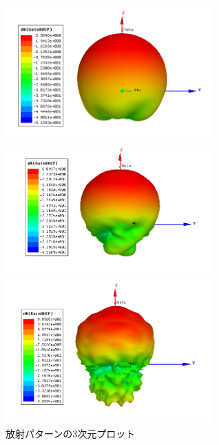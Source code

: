 \documentclass[11pt,a4paper,uplatex,draft]{ujarticle}
\begin{document}
  \begin{figure}[htbp]
    \centering
    \begin{minipage}[b]{0.45\hsize}
      \centering
      \includegraphics[keepaspectratio, width=80mm]{Images/gain_rhcp_5GHz.png}
    \end{minipage}
    \begin{minipage}[b]{0.45\hsize}
      \centering
      \includegraphics[keepaspectratio, width=80mm]{Images/gain_rhcp_10GHz.png}
    \end{minipage}
    \begin{minipage}[b]{0.45\hsize}
      \centering
      \includegraphics[keepaspectratio, width=80mm]{Images/gain_rhcp_15GHz.png}
    \end{minipage}
    \caption{放射パターンの3次元プロット}\label{fig:radiation_pattern_3D}
  \end{figure}
\end{document}
